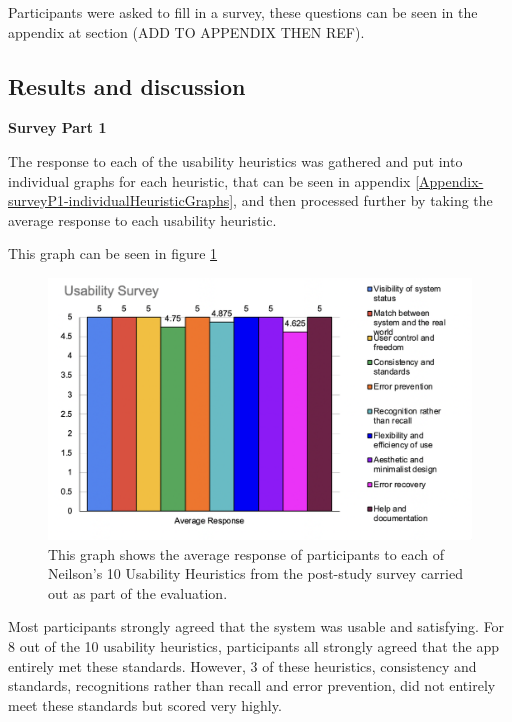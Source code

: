 \documentclass{l4proj}
\begin{document}
Participants were asked to fill in a survey, these questions can be seen in the appendix at section (ADD TO APPENDIX THEN REF).

\subsection{Results and discussion}

\textbf{Survey Part 1}
 
The response to each of the usability heuristics was gathered and put into individual graphs for each heuristic, that can be seen in appendix \ref{Appendix-surveyP1-individualHeuristicGraphs}, and then processed further by taking the average response to each usability heuristic.

This graph can be seen in figure \ref{fig: UserStudyGraph}

\begin{figure}
    \begin{centering}
    \includegraphics[scale=0.75]{images/UserStudyGraph.png}
    \caption{This graph shows the average response of participants to each of Neilson's 10 Usability Heuristics from the post-study survey carried out as part of the evaluation.}
    \label{fig: UserStudyGraph}
    \end{centering}
\end{figure}
 
Most participants strongly agreed that the system was usable and satisfying. For 8 out of the 10 usability heuristics, participants all strongly agreed that the app entirely met these standards. However, 3 of these heuristics, consistency and standards, recognitions rather than recall and error prevention, did not entirely meet these standards but scored very highly.
 
\end{document}
